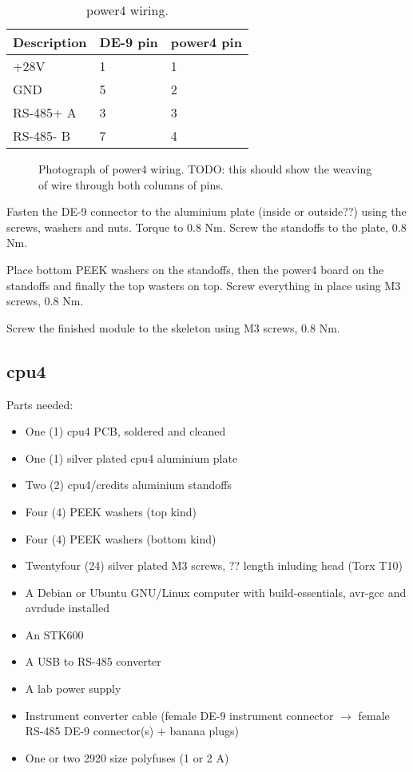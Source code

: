 \documentclass{article}
\begin{document}
\begin{table}[H]
\begin{centering}
\begin{tabular}{|l|l|l|}
\hline
{\bf Description} & {\bf DE-9 pin}    & {\bf power4 pin}\\ \hline
+28V              & 1                 & 1 \\ \hline
GND               & 5                 & 2 \\ \hline
RS-485+ A         & 3                 & 3 \\ \hline
RS-485- B         & 7                 & 4 \\ \hline
\end{tabular}
\caption{power4 wiring.}
\label{power4_table}
\end{centering}
\end{table}


\begin{figure}
\centering
\caption{Photograph of power4 wiring.
TODO: this should show the weaving of wire through both columns of pins.}
\label{power4_wires}
\end{figure}

Fasten the DE-9 connector to the aluminium plate (inside or outside??) using the screws, washers and nuts.
Torque to 0.8 Nm.
Screw the standoffs to the plate, 0.8 Nm.

Place bottom PEEK washers on the standoffs, then the power4 board on the standoffs and finally the top wasters on top.
Screw everything in place using M3 screws, 0.8 Nm.

Screw the finished module to the skeleton using M3 screws, 0.8 Nm.

\subsection{cpu4}

Parts needed:

\begin{itemize}
\item One (1) cpu4 PCB, soldered and cleaned
\item One (1) silver plated cpu4 aluminium plate
\item Two (2) cpu4/credits aluminium standoffs
\item Four (4) PEEK washers (top kind)
\item Four (4) PEEK washers (bottom kind)
\item Twentyfour (24) silver plated M3 screws, ?? length inluding head (Torx T10)
\item A Debian or Ubuntu GNU/Linux computer with build-essentials, avr-gcc and avrdude installed
\item An STK600
\item A USB to RS-485 converter
\item A lab power supply
\item Instrument converter cable (female DE-9 instrument connector $\rightarrow$ female RS-485 DE-9 connector(s) + banana plugs)
\item One or two 2920 size polyfuses (1 or 2 A)
\end{itemize}
\end{document}
